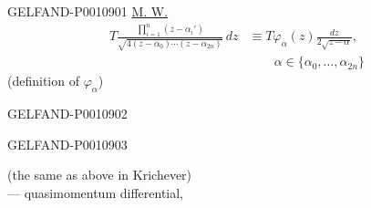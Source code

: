 \begin{GelfandAdjacentEvidence}{GELFAND-P001090}{1}
\uline{M. W.}
\begin{equation*}
\begin{aligned}
T\frac{\displaystyle\prod_{i=1}^{n}(z-\alpha_i')}
{\sqrt{4(z-\alpha_0)\cdots(z-\alpha_{2n})}}\,dz
&\equiv T\varphi_\alpha(z)\frac{dz}{2\sqrt{z-\alpha}},\\
&\hspace{2em}\alpha\in\{\alpha_0,\ldots,\alpha_{2n}\}
\end{aligned}
\tag{4}
\end{equation*}
(definition of $\varphi_\alpha$)
\end{GelfandAdjacentEvidence}
\begin{GelfandAdjacentEvidence}{GELFAND-P001090}{2}

\end{GelfandAdjacentEvidence}
\begin{GelfandAdjacentEvidence}{GELFAND-P001090}{3}


(the same as above in Krichever)\\
— quasimomentum differential,
\end{GelfandAdjacentEvidence}
